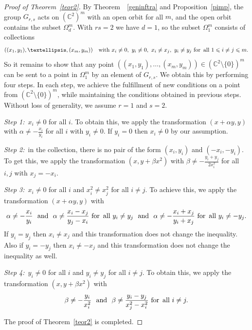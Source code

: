 \documentclass[10pt,a4paper]{amsart}
\def\CC{{\mathbb C}}
\renewcommand{\le}{\leqslant}
\begin{document}
\begin{proof}[Proof of Theorem~\ref{teor2}]
By Theorem~~\ref{geninftra} and Proposition~\ref{pimp}, the group $G_{r,s}$ acts on $(\CC^2)^m$ with an open orbit for all $m$, and the open orbit contains the subset $\Omega^m_d$. 
With $rs=2$ we have $d=1$, so the subset $\Omega^m_1$ consists of collections
$$
((x_1,y_1), \ldots, (x_m,y_m)) \quad \text{with} \ x_i\ne 0, \ y_i\ne 0, \ x_i\ne x_j, \ y_i\ne y_j \ \text{for\, all} \ 1\le i\ne j\le m. 
$$
So it remains to show that any point $((x_1,y_1), \ldots, (x_m,y_m))\in(\CC^2\setminus\{0\})^m$ can be sent to a point in $\Omega^m_1$ by an element of $G_{r,s}$. 
We obtain this by performing four steps. In each step, we achieve the fulfillment of new conditions on a point from $(\CC^2\setminus\{0\})^m$, while maintaining the conditions obtained in previous steps. Without loss of generality, we assume $r=1$ and $s=2$. 

\smallskip 

{\it Step 1:}\ $x_i\ne 0$ for all $i$. To obtain this, we apply the transformation $(x+\alpha y, y)$ with $\alpha\ne -\frac{x_i}{y_i}$ for all $i$ with $y_i\ne 0$. If $y_i=0$ then $x_i\ne 0$ by our assumption.  

\smallskip 

{\it Step 2:}\ in the collection, there is no pair of the form $(x_i,y_i)$ and $(-x_i,-y_i)$. To get this, we apply the transformation $(x, y+\beta x^2)$ with $\beta\ne -\frac{y_i+y_j}{2x_i^2}$ for all $i, j$ with $x_j=-x_i$. 

\smallskip 

{\it Step 3:}\ $x_i\ne 0$ for all $i$ and $x_i^2\ne x_j^2$ for all $i\ne j$. To achieve this, we apply the transformation $(x+\alpha y, y)$ with 
$$
\alpha\ne -\frac{x_i}{y_i}  \ \ \text{and} \ \ \alpha\ne\frac{x_i-x_j}{y_j-x_i} \ \text{for\, all} \ y_i\ne y_j \ \ \text{and} \ \ \alpha\ne -\frac{x_i+x_j}{y_i+x_j} \ \text{for\, all} \ y_i\ne -y_j.
$$
If  $y_i=y_j$ then $x_i\ne x_j$ and this transformation does not change the inequality. Also if $y_i=-y_j$ then $ x_i\ne -x_j$ and this transformation does not change the inequality as well. 

\smallskip 

{\it Step 4:}\ $y_i\ne 0$ for all $i$ and $y_i\ne y_j$ for all $i\ne j$. To obtain this, we apply the transformation $(x, y+\beta x^2)$ with
$$
\beta\ne -\frac{y_i}{x_i^2}  \ \ \text{and} \ \ \beta\ne\frac{y_i-y_j}{x_j^2-x_i^2}  \ \text{for\, all} \ i\ne j.
$$
\smallskip

The proof of Theorem~\ref{teor2} is completed. 
\end{proof}
\end{document}
